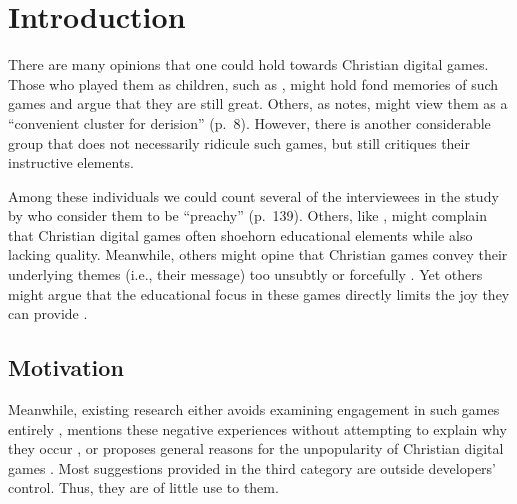 \chapter{Introduction} \label{ch:introduction}



There are many opinions that one could hold towards Christian digital games. Those who played them as children, such as \textcite{bri_great_2007, prairiedog_great_2007}, might hold fond memories of such games and argue that they are still great. Others, as \textcite{gonzalez_born-again_2014} notes, might view them as a ``convenient cluster for derision'' (p.~8). However, there is another considerable group that does not necessarily ridicule such games, but still critiques their instructive elements.

Among these individuals we could count several of the interviewees in the study by \textcite{schut_making_2013} who consider them to be ``preachy'' (p.~139). Others, like \textcite{hartgrove_why_2022}, might complain that Christian digital games often shoehorn educational elements while also lacking quality. Meanwhile, others might opine that Christian games convey their underlying themes (i.e., their message) too unsubtly \parencite{games_and_groceries_podcast_problem_2020} or forcefully \textcite[6:13--9:19]{monkastery_why_2018}. Yet others might argue that the educational focus in these games directly limits the joy they can provide \parencite[34:40]{moon_channel_why_2023}.

\section{Motivation} %

Meanwhile, existing research either avoids examining engagement in such games entirely \parencite{gonzalez_born-again_2014}, mentions these negative experiences without attempting to explain why they occur \parencite{schut_making_2013}, or proposes general reasons for the unpopularity of Christian digital games \parencite{bernauer_playing_2012, schut_swords_2026}. Most suggestions provided in the third category are outside developers' control. Thus, they are of little use to them.

